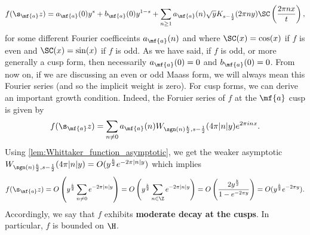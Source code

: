     \[
      f(\s_{\mf{a}}z) = a_{\mf{a}}(0)y^{s}+b_{\mf{a}}(0)y^{1-s}+\sum_{n \ge 1}a_{\mf{a}}(n)\sqrt{y}K_{s-\frac{1}{2}}(2\pi ny)\SC\left(\frac{2\pi nx}{t}\right),
    \]
    for some different Fourier coefficeints $a_{\mf{a}}(n)$ and where $\SC(x) = \cos(x)$ if $f$ is even and $\SC(x) = \sin(x)$ if $f$ is odd. As we have said, if $f$ is odd, or more generally a cusp form, then necessarily $a_{\mf{a}}(0) = 0$ and $b_{\mf{a}}(0) = 0$. From now on, if we are discussing an even or odd Maass form, we will always mean this Fourier series (and so the implicit weight is zero). For cusp forms, we can derive an important growth condition. Indeed, the Foruier series of $f$ at the $\mf{a}$ cusp is given by
    \[
      f(\s_{\mf{a}}z) = \sum_{n \neq 0}a_{\mf{a}}(n)W_{\sgn(n)\frac{k}{2},s-\frac{1}{2}}(4\pi|n|y)e^{2\pi inx}.
    \]
    Using \cref{lem:Whittaker_function_asymptotic}, we get the weaker asymptotic $W_{\sgn(n)\frac{k}{2},s-\frac{1}{2}}(4\pi|n|y) = O(y^{\frac{k}{2}}e^{-2\pi|n|y})$ which implies
    \[
      f(\s_{\mf{a}}z) = O\left(y^{\frac{k}{2}}\sum_{n \neq 0}e^{-2\pi|n|y}\right) = O\left(y^{\frac{k}{2}}\sum_{n \in \Z}e^{-2\pi|n|y}\right) = O\left(\frac{2y^{\frac{k}{2}}}{1-e^{-2\pi y}}\right) = O(y^{\frac{k}{2}}e^{-2\pi y}).
    \]
    Accordingly, we say that $f$ exhibits \textbf{moderate decay at the cusps}. In particular, $f$ is bounded on $\H$.
